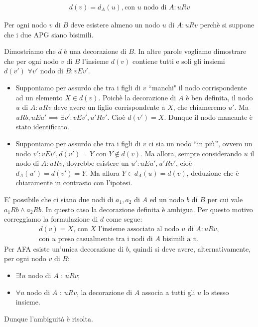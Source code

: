 \begin{proof2}
\begin{enumerate}
\begin{gather*}
                  d(v) = d_A(u), \text{con $u$ nodo di $A$} : u R v
              \end{gather*}
              \begin{observation*}
                  Per ogni nodo $v$ di $B$ deve esistere almeno un nodo $u$ di $A : u R v$ perchè si suppone che i due APG siano bisimili.
              \end{observation*}
              Dimostriamo che $d$ è una decorazione di $B$. In altre parole vogliamo dimostrare che per ogni nodo $v$ di $B$ l'insieme $d(v)$ contiene tutti e soli gli
              insiemi $d(v') \,\,\forall v'$ nodo di $B : v E v'$.
              \begin{itemize}
                  \item Supponiamo per assurdo che tra i figli di $v$ ``manchi" il nodo corrispondente ad un elemento $X \in d(v)$. Poichè la decorazione di $A$ è ben definita,
                        il nodo $u$ di $A : u R v$ deve avere un figlio corrispondente a $X$, che chiameremo $u'$. Ma $u R b, u E u' \implies \exists v' : v E v', u' R v'$.
                        Cioè $d(v') = X$. Dunque il nodo mancante è stato identificato.
                  \item Supponiamo per assurdo che tra i figli di $v$ ci sia un nodo ``in più'', ovvero un nodo $v' : v E v', d(v') = Y$ con $Y \notin d(v)$. Ma
                        allora, sempre considerando $u$ il nodo di $A : u R v$, dovrebbe esistere un $u' : u E u', u' R v'$, cioè $d_A(u') = d(v') = Y$.
                        Ma allora $Y \in d_A(u) = d(v)$, deduzione che è chiaramente in contrasto con l'ipotesi.
              \end{itemize}
              E' possibile che ci siano due nodi di $a_1, a_2$ di $A$ ed un nodo $b$ di $B$ per cui vale $a_1 R b \land a_2 R b$. In questo caso la decorazione definita è ambigua.
              Per questo motivo correggiamo la formulazione di $d$ come segue:
              \begin{gather*}
                d(v) = X \text{, con $X$ l'insieme associato al nodo $u$ di $A$} : u R v, \\
                \text{con $u$ preso casualmente tra i nodi di $A$ bisimili a $v$.}
              \end{gather*}
              Per AFA esiste un'unica decorazione di $b$, quindi si deve avere, alternativamente, per ogni nodo $v$ di $B$:
              \begin{itemize}
                  \item $\exists ! u$ nodo di $A$ : $u R v$;
                  \item $\forall u$ nodo di $A$ : $u R v$, la decorazione di $A$ associa a tutti gli $u$ lo stesso insieme.
              \end{itemize}
              Dunque l'ambiguità è risolta.
    \end{enumerate}
    \vspace*{-0.75cm}
\end{proof2}
